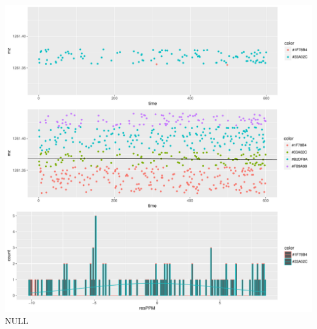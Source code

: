 \documentclass[]{article}
\begin{document}
\includegraphics{Supplementary_document_files/figure-latex/filter.lm.1261-1.pdf}
NULL
\end{document}
